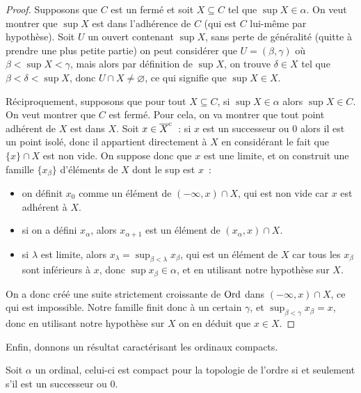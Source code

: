 \begin{proof}
  Supposons que $C$ est un fermé et soit $X\subseteq C$ tel que
  $\sup X \in \alpha$. On veut montrer que $\sup X$ est dans l'adhérence de $C$
  (qui est $C$ lui-même par hypothèse). Soit $U$ un ouvert contenant
  $\sup X$, sans perte de généralité (quitte à prendre une plus petite partie)
  on peut considérer que $U = (\beta, \gamma)$ où $\beta < \sup X < \gamma$,
  mais alors par définition de $\sup X$, on trouve $\delta \in X$ tel que
  $\beta < \delta < \sup X$, donc $U \cap X \neq\varnothing$, ce qui signifie
  que $\sup X \in X$.

  Réciproquement, supposons que pour tout $X\subseteq C$, si $\sup X \in \alpha$
  alors $\sup X \in C$. On veut montrer que $C$ est fermé. Pour cela, on va
  montrer que tout point adhérent de $X$ est dans $X$. Soit $x \in \overline{X}^{\mathrm c}$~:
  si $x$ est un successeur ou $0$ alors il est un point isolé, donc il
  appartient directement à $X$ en considérant le fait que $\{x\}\cap X$ est non
  vide. On suppose donc que $x$ est une limite, et on construit une famille
  $\{x_\beta\}$ d'éléments de $X$ dont le sup est $x$~:
  \begin{itemize}
  \item on définit $x_0$ comme un élément de $(-\infty, x)\cap X$, qui est non
    vide car $x$ est adhérent à $X$.
  \item si on a défini $x_\alpha$, alors $x_{\alpha + 1}$ est un élément de
    $(x_\alpha,x)\cap X$.
  \item si $\lambda$ est limite, alors
    $x_{\lambda}=\sup_{\beta < \lambda}x_\beta$, qui est un élément de $X$ car
    tous les $x_\beta$ sont inférieurs à $x$, donc $\sup x_\beta\in \alpha$,
    et en utilisant notre hypothèse sur $X$.
  \end{itemize}
  On a donc créé une suite strictement croissante de $\operatorname{Ord}$ dans
  $(-\infty,x)\cap X$, ce qui est impossible. Notre famille finit donc à un
  certain $\gamma$, et $\sup_{\beta < \gamma} x_\beta = x$, donc en utilisant
  notre hypothèse sur $X$ on en déduit que $x\in X$.
\end{proof}

Enfin, donnons un résultat caractérisant les ordinaux compacts.

\begin{proposition}\label{prop.compac.succ}
  Soit $\alpha$ un ordinal, celui-ci est compact pour la topologie de l'ordre si
  et seulement s'il est un successeur ou $0$.
\end{proposition}

